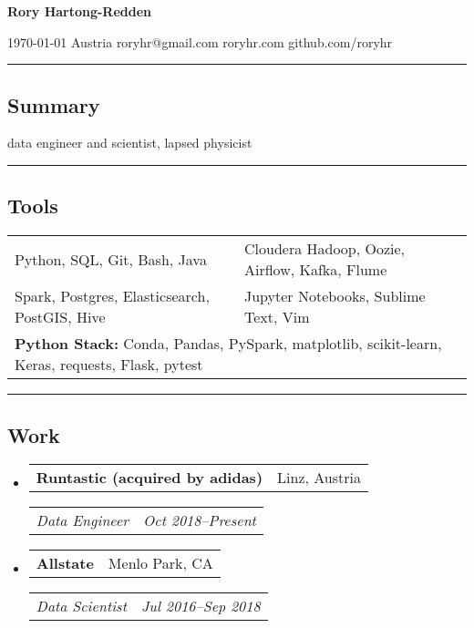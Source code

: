 \documentclass[10pt,letterpaper]{article}
\makeatletter
\newenvironment{indentsection}[1]
{\begin{list}{}%
	{\setlength{\leftmargin}{#1}}
	\item[]%
}
{\end{list}}
\newcommand{\headerrow}[2]{
\begin{tabular*}{\linewidth}{l@{\extracolsep{\fill}}r}
		#1 &
		#2 \\
	\end{tabular*}
}
\newcommand{\jobitem}[4]{\item \headerrow{\textbf{#1}}{#2}
\headerrow{\emph{#3}}{\emph{#4}}}
\makeatother
\begin{document}
{\raggedright \LARGE \bf Rory Hartong-Redden\\}

{\raggedleft 
\today \/ \textbar
\/ Austria \textbar
\/ roryhr@gmail.com \textbar
\/ roryhr.com \textbar\/   
github.com/roryhr\\
}
\hrule

\subsection*{Summary}
\begin{centering}  
data engineer and scientist, lapsed physicist\\
\end{centering}

\hrule
\subsection*{Tools}
\begin{indentsection}{\parindent}
\begin{tabular}{p{0.5\linewidth}   p{0.5\linewidth}} 
	Python, SQL, Git, Bash, Java
	& Cloudera Hadoop, Oozie, Airflow, Kafka, Flume\\

	Spark, Postgres, Elasticsearch, PostGIS, Hive 
	& Jupyter Notebooks, Sublime Text, Vim\\ 
	
	\multicolumn{2}{l}{
		\textbf{Python Stack:} Conda, Pandas, PySpark, matplotlib, scikit-learn,
							Keras, requests, Flask, pytest} \\
\end{tabular}
\end{indentsection}

\hrule
\subsection*{Work}
\begin{itemize}
	\jobitem{Runtastic (acquired by adidas)}{Linz, Austria}
		     {Data Engineer}{Oct 2018--Present}
\end{itemize}

\begin{itemize}
	\jobitem{Allstate}{Menlo Park, CA}
		     {Data Scientist}{Jul 2016--Sep 2018}
\end{itemize}
\end{document}
